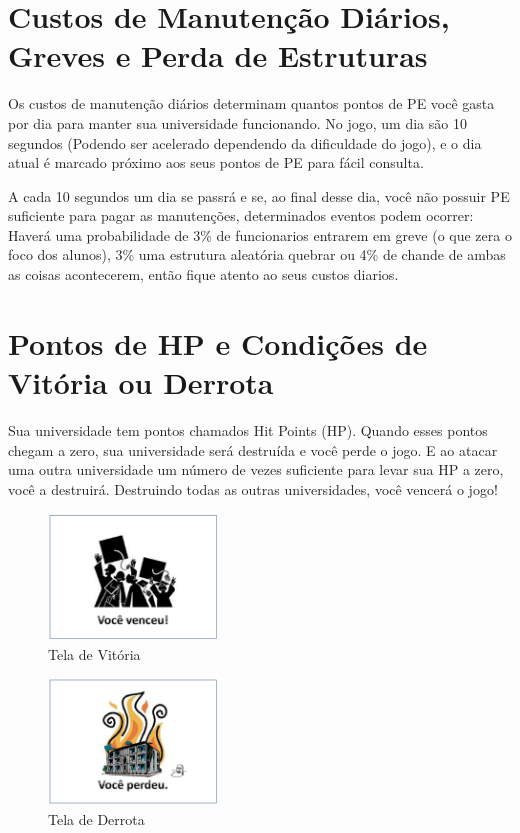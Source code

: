 \documentclass[brazil,times]{abnt}
\begin{document}
\section{Custos de Manutenção Diários, Greves e Perda de Estruturas}
Os custos de manutenção diários determinam quantos pontos de PE você gasta por
dia para manter sua universidade funcionando. No jogo, um dia são 10 segundos
(Podendo ser acelerado dependendo da dificuldade do jogo), e o dia atual é
marcado próximo aos seus pontos de PE para fácil consulta.

A cada 10 segundos um dia se passrá e se, ao final desse dia, você não possuir
PE suficiente para pagar as manutenções, determinados eventos podem ocorrer:
Haverá uma probabilidade de 3\% de funcionarios entrarem em greve (o que zera o
foco dos alunos), 3\% uma estrutura aleatória quebrar ou 4\% de chande de ambas
as coisas acontecerem, então fique atento ao seus custos diarios.

\section{Pontos de HP e Condições de Vitória ou Derrota}
Sua universidade tem pontos chamados Hit Points (HP). Quando esses pontos chegam
a zero, sua universidade será destruída e você perde o jogo. E ao atacar uma
outra universidade um número de vezes suficiente para levar sua HP a zero, você
a destruirá. Destruindo todas as outras universidades, você vencerá o jogo!

\begin{figure}[htp]
\begin{center}
  \includegraphics[width=0.4\textwidth]{img/Figura6manual.PNG}
  \caption[Tela de Vitória]{Tela de Vitória}
  \label{tela-vitoria}
\end{center}
\end{figure}

\begin{figure}[htp]
\begin{center}
  \includegraphics[width=0.4\textwidth]{img/Figura7manual.PNG}
  \caption[Tela de Derrota]{Tela de Derrota}
  \label{tela-derrota}
\end{center}
\end{figure}
\end{document}
